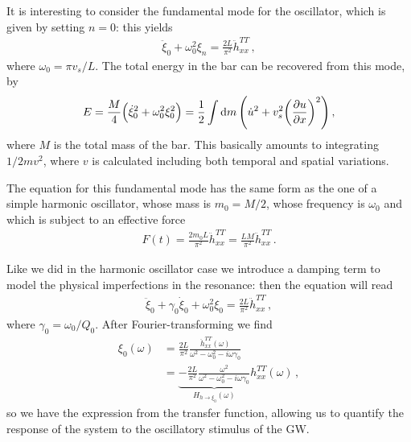 \documentclass[main.tex]{subfiles}
\begin{document}

It is interesting to consider the fundamental mode for the oscillator, which is given by setting \(n =0\): this yields 
%
\begin{align}
\ddot{\xi}_{0} + \omega_0^2 \xi_{n} = \frac{2L}{\pi^2} \ddot{h}^{TT}_{xx}
\,,
\end{align}
%
where \(\omega_0 = \pi v_s /L\). 
The total energy in the bar can be recovered from this mode, by 
%
\begin{align}
E = \frac{M}{4} \qty(\dot{\xi}_{0}^2 + \omega_0^2 \xi_0^2 )
= \frac{1}{2} \int \dd{m} \qty(\dot{u}^2 + v_s^2 \qty(\pdv{u}{x})^2)
\,,
\end{align}
%
where \(M\) is the total mass of the bar. This basically amounts to integrating \(1/2 m v^2\), where \(v\) is calculated including both temporal and spatial variations. 

The equation for this fundamental mode has the same form as the one of a simple harmonic oscillator, whose mass is \(m_0 = M/2\), whose frequency is \(\omega_0 \) and which is subject to an effective force 
%
\begin{align}
F(t) = \frac{2  m_0  L}{\pi^2} \ddot{h}_{xx}^{TT} = \frac{LM}{\pi^2}
\ddot{h}^{TT}_{xx}
\,.
\end{align}

Like we did in the harmonic oscillator case we introduce a damping term to model the physical imperfections in the resonance: then the equation will read 
%
\begin{align} \label{eq:damped-zeroth-mode-resonant-bar}
\ddot{\xi}_{0} + \gamma_0 \dot{\xi}_{0} + \omega_0^2 \xi_0 = \frac{2L}{\pi^2} \ddot{h}^{TT}_{xx}
\,,
\end{align}
%
where \(\gamma_0 = \omega_0 / Q_0 \). 
After Fourier-transforming we find 
%
\begin{align}
\xi_0 (\omega ) 
&= \frac{2L}{\pi^2} \frac{\ddot{h}_{xx}^{TT} (\omega )}{\omega^2- \omega_0 ^2 - i \omega \gamma_0 }  \\
&= \underbrace{-\frac{2L}{\pi^2} \frac{\omega^2}{\omega^2- \omega_0 ^2 - i \omega \gamma_0 }}_{H_{h \to \xi_0 } (\omega )}  h_{xx}^{TT} (\omega )
\,,
\end{align}
%
so we have the expression from the transfer function, allowing us to quantify the response of the system to the oscillatory stimulus of the GW. 
\end{document}
